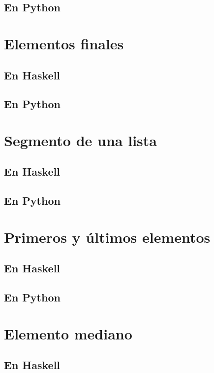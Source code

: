 \documentclass[a4paper,12pt,twoside]{book}
\begin{document}
\subsection*{En Python}

\section{Elementos finales}
\subsection*{En Haskell}
\subsection*{En Python}

\section{Segmento de una lista}
\subsection*{En Haskell}
\subsection*{En Python}

\section{Primeros y últimos elementos}
\subsection*{En Haskell}
\subsection*{En Python}

\section{Elemento mediano}
\subsection*{En Haskell}
\end{document}
